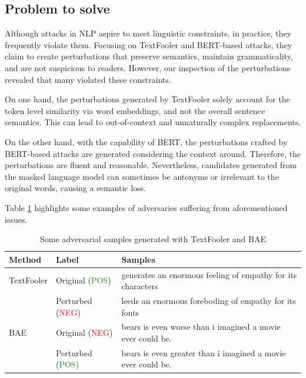 \subsection{Problem to solve}\label{subsec:problem-to-solve}
Although attacks in NLP aspire to meet linguistic constraints, in practice, they frequently violate them.
Focusing on TextFooler and BERT-based attacks, they claim to create perturbations that preserve semantics, maintain grammaticality, and are not suspicious to readers. 
However, our inspection of the perturbations revealed that many violated these constraints.

On one hand, the perturbations generated by TextFooler solely account for the token level similarity via word embeddings, and not the overall sentence semantics. This can lead to out-of-context and unnaturally complex replacements.

On the other hand, with the capability of BERT, the perturbations crafted by BERT-based attacks are generated considering the context around. Therefore, the perturbations are fluent and reasonable.
Nevertheless, candidates generated from the masked language model can sometimes be antonyms or irrelevant to the original words, causing a semantic loss.

Table \ref{tab:3_1_wrong_adversarial_examples} highlights some examples of adversaries suffering from aforementioned issues.

\begin{table}[h]
    \footnotesize
    \centering
    \begin{tabularx}{\textwidth}{|l||l|X|}
      \hline
      Method & Label  & Samples \\
      \hline \hline
      TextFooler & Original (\textcolor{ForestGreen}{POS}) & generates an enormous feeling of empathy for its characters \\
                 & Perturbed (\textcolor{red}{NEG}) & leeds an enormous foreboding of empathy for its fonts
                 \\
      \hline
     
      BAE & Original (\textcolor{red}{NEG}) & bears is even worse than i imagined a movie ever could be.     \\
      & Perturbed (\textcolor{ForestGreen}{POS}) & bears is even greater than i imagined a movie ever could be.
    \\
        
      \hline
    \end{tabularx}
    \caption{Some adversarial samples generated with TextFooler and BAE}
  \label{tab:3_1_wrong_adversarial_examples}
\end{table}

